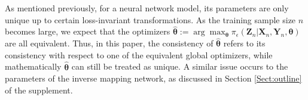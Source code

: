 \documentclass[11pt]{article}
\newcommand{\bX}{{\boldsymbol X}}
\newcommand{\bY}{{\boldsymbol Y}}
\newcommand{\bz}{{\boldsymbol z}}
\newcommand{\bZ}{{\boldsymbol Z}}
\newcommand{\bw}{{\boldsymbol w}}
\newcommand{\bs}{{\boldsymbol s}}
\newcommand{\btheta}{{\boldsymbol \theta}}
\begin{document}



As mentioned previously, for 
 a neural network model, its parameters are only unique up to certain loss-invariant transformations. 
As the training sample size $n$ becomes large, we expect that the optimizers 
$\hat{\btheta}:=\arg\max_{\btheta} \pi_{\epsilon}(\bZ_n|\bX_n,\bY_n,\btheta)$ are all equivalent.
Thus, in this paper, the consistency of $\hat{\btheta}$ refers to its consistency with respect to one of the equivalent global optimizers, 
while mathematically $\hat{\btheta}$
can still be treated as unique. A similar issue occurs to the parameters of the inverse mapping network, as discussed in Section \ref{Sect:outline} of the supplement.  
\end{document}
